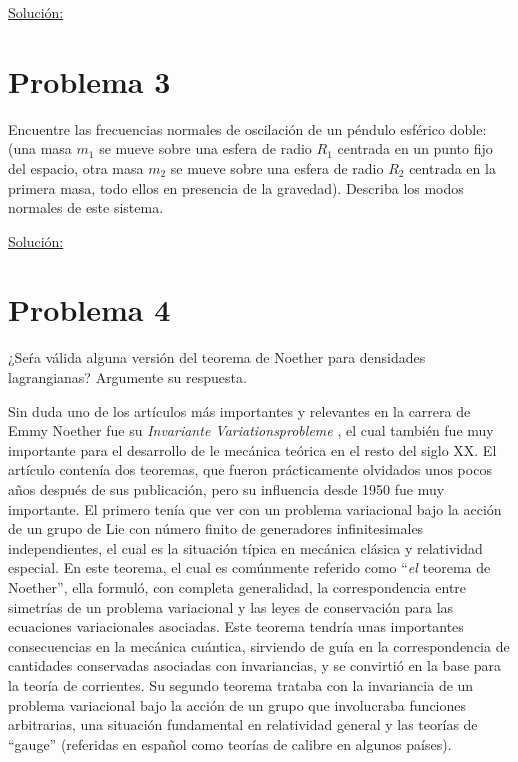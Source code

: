 \documentclass[a4paper,10pt]{article}
\numberwithin{equation}{section}
\begin{document}
\underline{Solución:} \vspace{.3cm}

\section{Problema 3}

Encuentre las frecuencias normales de oscilación de un péndulo esférico doble: (una 
masa $m_1$ se mueve sobre una esfera de radio $R_1$ centrada en un punto fijo del 
espacio, otra masa $m_2$ se mueve sobre una esfera de radio $R_2$ centrada en la 
primera masa, todo ellos en presencia de la gravedad). Describa los modos normales 
de este sistema.

\vspace{.3cm}

\underline{Solución:} \vspace{.3cm}

\section{Problema 4}

¿Seŕa válida alguna versión del teorema de Noether para densidades lagrangianas? Argumente 
su respuesta.

\vspace{.3cm}

Sin duda uno de los artículos más importantes y relevantes en la carrera de 
Emmy Noether fue su \emph{Invariante Variationsprobleme} \cite{noether}, el cual también 
fue muy importante para el desarrollo de le mecánica teórica en el resto del siglo 
XX. El artículo contenía dos teoremas, que fueron prácticamente olvidados unos pocos 
años después de sus publicación, pero su influencia desde 1950 fue muy importante. 
El primero tenía que ver con un problema variacional bajo la acción de un grupo de 
Lie con número finito de generadores infinitesimales independientes, el cual es 
la situación típica en mecánica clásica y relatividad especial. En este teorema, 
el cual es comúnmente referido como ``\emph{el} teorema de Noether'', ella formuló, 
con completa generalidad, la correspondencia entre simetrías de un problema variacional 
y las leyes de conservación para las ecuaciones variacionales asociadas. Este teorema 
tendría unas importantes consecuencias en la mecánica cuántica, sirviendo de guía 
en la correspondencia de cantidades conservadas asociadas con invariancias, y se 
convirtió en la base para la teoría de corrientes. Su segundo teorema trataba con 
la invariancia de un problema variacional bajo la acción de un grupo que involucraba 
funciones arbitrarias, una situación fundamental en relatividad general y las 
teorías de ``gauge'' (referidas en español como teorías de calibre en algunos países).
\end{document}
